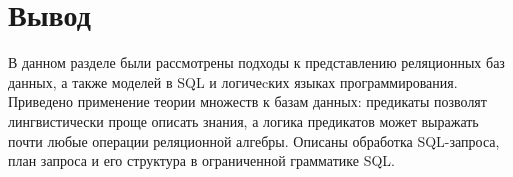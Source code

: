 \section*{Вывод}
\vspace{-0.5cm}
В данном разделе были рассмотрены подходы к представлению реляционных баз данных, а также моделей в SQL и логичеcких языках программирования. Приведено применение теории множеств к базам данных: предикаты позволят лингвистически проще описать знания, а логика предикатов может выражать почти любые операции реляционной алгебры. Описаны обработка SQL-запроса, план запроса и его структура в ограниченной грамматике SQL. 